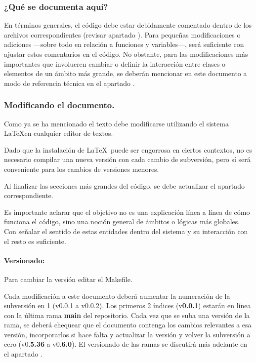 \subsubsection{¿Qué se documenta aquí?}
En términos generales, el código debe estar debidamente comentado dentro de los archivos correspondientes (revisar apartado ). Para pequeñas modificaciones o adiciones ---sobre todo en relación a funciones y variables---, será suficiente con ajustar estos comentarios en el código. No obstante, para las modificaciones más importantes que involucren cambiar o definir la interacción entre clases o elementos de un ámbito más grande, se deberán mencionar en este documento a modo de referencia técnica en el apartado .

\subsubsection{Modificando el documento.}
Como ya se ha mencionado el texto debe modificarse utilizando el sistema \LaTeX en cualquier editor de textos.

Dado que la instalación de \LaTeX\ puede ser engorrosa en ciertos contextos, no es necesario compilar una nueva versión con cada cambio de subversión, pero sí será conveniente para los cambios de versiones menores.

Al finalizar las secciones más grandes del código, se debe actualizar el apartado correspondiente.

Es importante aclarar que el objetivo no es una explicación línea a línea de cómo funciona el código, sino una noción general de ámbitos o lógicas más globales. Con señalar el sentido de estas entidades dentro del sistema y su interacción con el resto es suficiente.

\paragraph{Versionado:}
Para cambiar la versión editar el Makefile.

Cada modificación a este documento deberá aumentar la numeración de la subversión en 1 (v0.0.1 a v0.0.2). Los primeros 2 índices (v\textbf{0.0.}1) estarán en línea con la última rama \textbf{main} del repositorio. Cada vez que se suba una versión de la rama, se deberá chequear que el documento contenga los cambios relevantes a esa versión, incorporarlos si hace falta y actualizar la versión y volver la subversión a cero (v0.\textbf{5.36} a v0.\textbf{6.0}). El versionado de las ramas se discutirá más adelante en el apartado .

